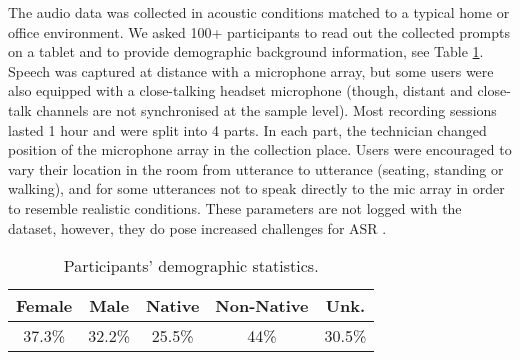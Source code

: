 \documentclass[11pt,a4paper]{article}
\newcommand{\asr}{ASR}
\begin{document}
The audio data was collected in acoustic conditions matched to a typical home or office environment. We asked 100+ participants to read out the collected prompts on a tablet and to provide demographic background information, see Table \ref{tab:dem}. Speech was captured at distance with a microphone array, but some users were also equipped with a close-talking headset microphone (though, distant and close-talk channels are not synchronised at the sample level). Most recording sessions lasted 1 hour and were split into 4 parts. In each part, the technician changed position of the microphone array in the collection place. Users were encouraged to vary their location in the room from utterance to utterance (seating, standing or walking), and for some utterances not to speak directly to the mic array in order to resemble realistic conditions. These parameters are not logged with the dataset, however, they do pose increased challenges for \asr{} \cite{Marino2011AnAO}.


\begin{table}[!h]
    \centering
    \footnotesize
    \begin{tabular}{c|c|c|c|c}
\toprule
Female & Male & Native & Non-Native & Unk.\\
\midrule
37.3\% & 32.2\% & 25.5\% & 44\% & 30.5\% \\
\bottomrule
\end{tabular}
    \caption{Participants' demographic statistics.}
    \label{tab:dem}
\end{table}
\end{document}
